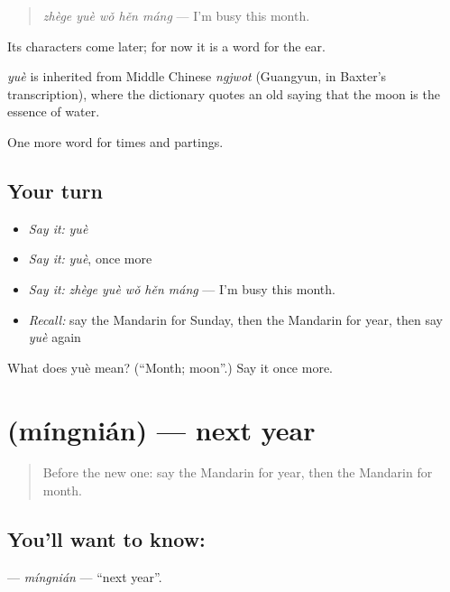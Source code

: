 \begin{quote}
\emph{zhège yuè wǒ hěn máng} — I'm busy this month.
\end{quote}

Its characters come later; for now it is a word for the ear.

\begin{cousinweb}
\emph{yuè} is inherited from Middle Chinese \emph{ngjwot} (Guangyun, in Baxter's transcription), where the dictionary quotes an old saying that the moon is the essence of water.
\end{cousinweb}

\begin{grammarlens}[title={What you've built}]
One more word for times and partings.
\end{grammarlens}

\subsection*{Your turn}
\begin{itemize}
\raggedright
  \item \emph{Say it:} \emph{yuè}
  \item \emph{Say it:} \emph{yuè}, once more
  \item \emph{Say it:} \emph{zhège yuè wǒ hěn máng} — I'm busy this month.
  \item \emph{Recall:} say the Mandarin for Sunday, then the Mandarin for year, then say \emph{yuè} again
\end{itemize}

\begin{tcolorbox}[breakable,colback=teal!4,colframe=teal!35!black,title={Before you move on}]
What does yuè mean? (\textquotedblleft{}Month; moon\textquotedblright{}.) Say it once more.
\end{tcolorbox}
\section[\texorpdfstring{\zh{明年} (míngnián)}{明年 (míngnián)}]{ (míngnián) — next year}

\label{lesson:ZH-C47-mingnian}



\begin{quote}
Before the new one: say the Mandarin for year, then the Mandarin for month.
\end{quote}

\subsection*{You'll want to know: }
\textbf{} — \emph{míngnián} — \textquotedblleft{}next year\textquotedblright{}.

